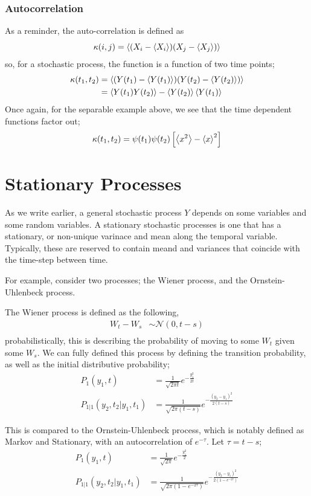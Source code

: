 \subsubsection{Autocorrelation}
As a reminder, the auto-correlation is defined as
\begin{equation}
	\kappa(i, j) = \left\langle{(X_i - \left\langle{X_i}\right\rangle) (X_j - \left\langle{X_j}\right\rangle)}\right\rangle
\end{equation}
so, for a stochastic process, the function is a function of two time points;
\begin{align*}
	\kappa(t_1, t_2) &= \left\langle{(Y(t_1) - \left\langle{Y(t_1)}\right\rangle) (Y(t_2) - \left\langle{Y(t_2)}\right\rangle)}\right\rangle\\
	&= \left\langle{Y(t_1)Y(t_2)}\right\rangle - \left\langle{Y(t_2)}\right\rangle\left\langle{Y(t_1)}\right\rangle
\end{align*}
Once again, for the separable example above, we see that the time dependent functions factor out;
\[\kappa(t_1, t_2) = \psi(t_1)\psi(t_2)\left[\left\langle{x^2}\right\rangle - \left\langle{x}\right\rangle^2\right]\]

\section{Stationary Processes}
As we write earlier, a general stochastic process $Y$ depends on some variables and some random variables. A stationary stochastic processes is one that has a stationary, or non-unique varinace and mean along the temporal variable. Typically, these are reserved to contain meand and variances that coincide with the time-step between time.

For example, consider two processes; the Wiener process, and the Ornstein-Uhlenbeck process.


The Wiener process is defined as the following,
\begin{align*}
	W_t - W_s &\sim \mathcal{N}(0, t-s) \\
\end{align*}
probabilistically, this is describing the probability of moving to some $W_t$ given some $W_s$. We can fully defined this process by defining the transition probability, as well as the initial distributive probability;
\begin{align*}
	P_1(y_1, t) &= \frac{1}{\sqrt{2\pi t}}e^{-\frac{y_1^2}{2t}} \\
	P_{1|1}(y_2, t_2 | y_1 , t_1) &= \frac{1}{\sqrt{2\pi(t-s)}}e^{-\frac{(y_2-y_1)^2}{2(t-s)}}
\end{align*}

This is compared to the Ornstein-Uhlenbeck process, which is notably defined as Markov and Stationary, with an autocorrelation of $e^{-\tau}$. Let $\tau = t-s$;
\begin{align*}
	P_1(y_1, t) &= \frac{1}{\sqrt{2\pi}}e^{-\frac{y_1^2}{2}} \\
	P_{1|1}(y_2, t_2 | y_1 , t_1) &= \frac{1}{\sqrt{2\pi(1-e^{-2\tau})}}e^{-\frac{(y_2-y_1)^2}{2(1-e^{-2\tau})}}
\end{align*}

